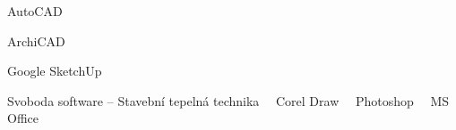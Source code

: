 

\begin{cvskills}

  
  \cvskill
    {AutoCAD} %
    {\faCircle\,\faCircle\,\faCircle\,\faCircle\,\faCircleO}

    
  \cvskill
    {ArchiCAD} %
    {\faCircle\,\faCircle\,\faCircle\,\faCircleO\,\faCircleO} %
  
  \cvskill
    {Google SketchUp} %
    {\faCircle\,\faCircle\,\faCircle\,\faCircle\,\faCircleO} %

  \cvskill
    {Svoboda software – Stavební tepelná technika}
    {\faCircle\,\faCircle\,\faCircle\,\faCircle\,\faCircleO}
    \cvskill
    {Corel Draw}
    {\faCircle\,\faCircle\,\faCircle\,\faCircleO\,\faCircleO}
    \cvskill
    {Photoshop}
    {\faCircle\,\faCircle\,\faCircleO\,\faCircleO\,\faCircleO}
    \cvskill
    {MS Office}
    {\faCircle\,\faCircle\,\faCircle\,\faCircle\,\faCircleO}
\end{cvskills}
